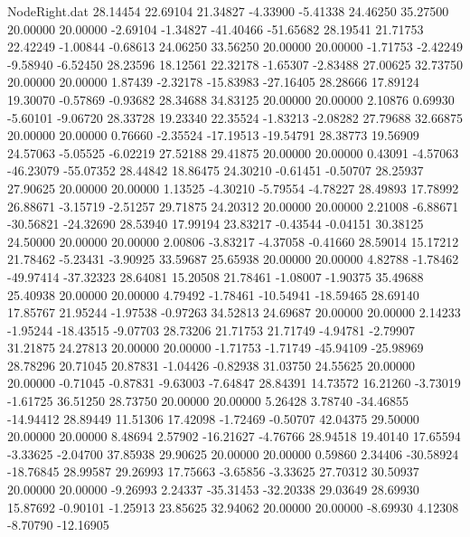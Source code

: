 \begin{filecontents}{NodeRight.dat}
  28.14454   22.69104   21.34827    -4.33900   -5.41338   24.46250   35.27500   20.00000   20.00000   -2.69104   -1.34827  -41.40466  -51.65682
  28.19541   21.71753   22.42249    -1.00844   -0.68613   24.06250   33.56250   20.00000   20.00000   -1.71753   -2.42249   -9.58940   -6.52450
  28.23596   18.12561   22.32178    -1.65307   -2.83488   27.00625   32.73750   20.00000   20.00000    1.87439   -2.32178  -15.83983  -27.16405
  28.28666   17.89124   19.30070    -0.57869   -0.93682   28.34688   34.83125   20.00000   20.00000    2.10876    0.69930   -5.60101   -9.06720
  28.33728   19.23340   22.35524    -1.83213   -2.08282   27.79688   32.66875   20.00000   20.00000    0.76660   -2.35524  -17.19513  -19.54791
  28.38773   19.56909   24.57063    -5.05525   -6.02219   27.52188   29.41875   20.00000   20.00000    0.43091   -4.57063  -46.23079  -55.07352
  28.44842   18.86475   24.30210    -0.61451   -0.50707   28.25937   27.90625   20.00000   20.00000    1.13525   -4.30210   -5.79554   -4.78227
  28.49893   17.78992   26.88671    -3.15719   -2.51257   29.71875   24.20312   20.00000   20.00000    2.21008   -6.88671  -30.56821  -24.32690
  28.53940   17.99194   23.83217    -0.43544   -0.04151   30.38125   24.50000   20.00000   20.00000    2.00806   -3.83217   -4.37058   -0.41660
  28.59014   15.17212   21.78462    -5.23431   -3.90925   33.59687   25.65938   20.00000   20.00000    4.82788   -1.78462  -49.97414  -37.32323
  28.64081   15.20508   21.78461    -1.08007   -1.90375   35.49688   25.40938   20.00000   20.00000    4.79492   -1.78461  -10.54941  -18.59465
  28.69140   17.85767   21.95244    -1.97538   -0.97263   34.52813   24.69687   20.00000   20.00000    2.14233   -1.95244  -18.43515   -9.07703
  28.73206   21.71753   21.71749    -4.94781   -2.79907   31.21875   24.27813   20.00000   20.00000   -1.71753   -1.71749  -45.94109  -25.98969
  28.78296   20.71045   20.87831    -1.04426   -0.82938   31.03750   24.55625   20.00000   20.00000   -0.71045   -0.87831   -9.63003   -7.64847
  28.84391   14.73572   16.21260    -3.73019   -1.61725   36.51250   28.73750   20.00000   20.00000    5.26428    3.78740  -34.46855  -14.94412
  28.89449   11.51306   17.42098    -1.72469   -0.50707   42.04375   29.50000   20.00000   20.00000    8.48694    2.57902  -16.21627   -4.76766
  28.94518   19.40140   17.65594    -3.33625   -2.04700   37.85938   29.90625   20.00000   20.00000    0.59860    2.34406  -30.58924  -18.76845
  28.99587   29.26993   17.75663    -3.65856   -3.33625   27.70312   30.50937   20.00000   20.00000   -9.26993    2.24337  -35.31453  -32.20338
  29.03649   28.69930   15.87692    -0.90101   -1.25913   23.85625   32.94062   20.00000   20.00000   -8.69930    4.12308   -8.70790  -12.16905

\end{filecontents}
